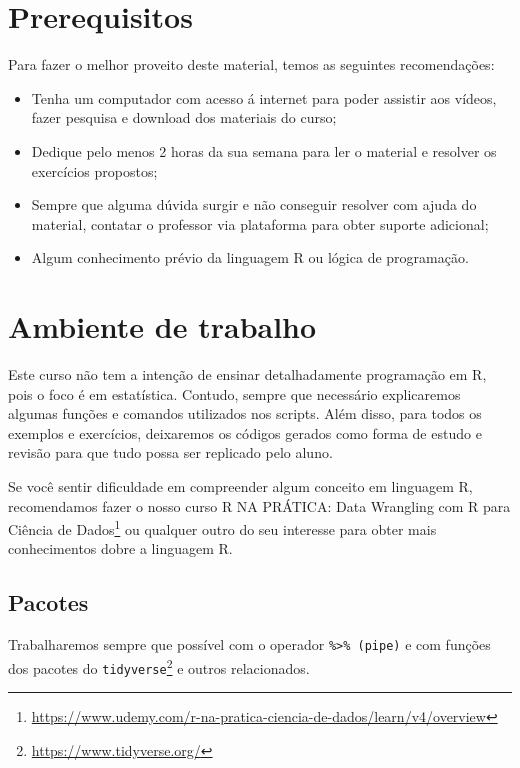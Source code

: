 \documentclass[12pt,]{style/krantz}
\providecommand{\tightlist}{%
  \setlength{\itemsep}{0pt}\setlength{\parskip}{0pt}}
\renewcommand{\href}[2]{#2\footnote{\url{#1}}}
\theoremstyle{definition}
\theoremstyle{definition}
\theoremstyle{definition}
\theoremstyle{remark}
\begin{document}
\section*{Prerequisitos}\label{prerequisitos}


Para fazer o melhor proveito deste material, temos as seguintes
recomendações:

\begin{itemize}
\tightlist
\item
  Tenha um computador com acesso á internet para poder assistir aos
  vídeos, fazer pesquisa e download dos materiais do curso;
\item
  Dedique pelo menos 2 horas da sua semana para ler o material e
  resolver os exercícios propostos;
\item
  Sempre que alguma dúvida surgir e não conseguir resolver com ajuda do
  material, contatar o professor via plataforma para obter suporte
  adicional;
\item
  Algum conhecimento prévio da linguagem R ou lógica de programação.
\end{itemize}

\section*{Ambiente de trabalho}\label{ambiente-de-trabalho}


Este curso não tem a intenção de ensinar detalhadamente programação em
R, pois o foco é em estatística. Contudo, sempre que necessário
explicaremos algumas funções e comandos utilizados nos scripts. Além
disso, para todos os exemplos e exercícios, deixaremos os códigos
gerados como forma de estudo e revisão para que tudo possa ser replicado
pelo aluno.

Se você sentir dificuldade em compreender algum conceito em linguagem R,
recomendamos fazer o nosso curso
\href{https://www.udemy.com/r-na-pratica-ciencia-de-dados/learn/v4/overview}{R
NA PRÁTICA: Data Wrangling com R para Ciência de Dados} ou qualquer
outro do seu interesse para obter mais conhecimentos dobre a linguagem
R.

\subsection*{Pacotes}\label{pacotes}


Trabalharemos sempre que possível com o operador
\texttt{\%\textgreater{}\%\ (pipe)} e com funções dos pacotes do
\href{https://www.tidyverse.org/}{\texttt{tidyverse}} e outros
relacionados.
\end{document}
